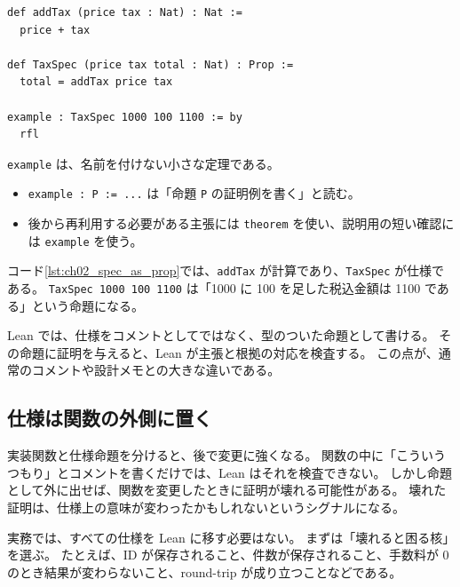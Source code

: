 \begin{listing}[htbp]
\begin{verbatim}
def addTax (price tax : Nat) : Nat :=
  price + tax

def TaxSpec (price tax total : Nat) : Prop :=
  total = addTax price tax

example : TaxSpec 1000 100 1100 := by
  rfl
\end{verbatim}
\caption{仕様を関数と命題に分ける}
\label{lst:ch02_spec_as_prop}
\end{listing}

\begin{syntaxbox}
\texttt{example} は、名前を付けない小さな定理である。
\begin{itemize}
\item \texttt{example : P := ...} は「命題 \texttt{P} の証明例を書く」と読む。
\item 後から再利用する必要がある主張には \texttt{theorem} を使い、説明用の短い確認には \texttt{example} を使う。
\end{itemize}
\end{syntaxbox}


コード\ref{lst:ch02_spec_as_prop}では、\texttt{addTax} が計算であり、\texttt{TaxSpec} が仕様である。
\texttt{TaxSpec 1000 100 1100} は「1000 に 100 を足した税込金額は 1100 である」という命題になる。

\begin{leanbox}
Lean では、仕様をコメントとしてではなく、型のついた命題として書ける。
その命題に証明を与えると、Lean が主張と根拠の対応を検査する。
この点が、通常のコメントや設計メモとの大きな違いである。
\end{leanbox}

\subsection{仕様は関数の外側に置く}

実装関数と仕様命題を分けると、後で変更に強くなる。
関数の中に「こういうつもり」とコメントを書くだけでは、Lean はそれを検査できない。
しかし命題として外に出せば、関数を変更したときに証明が壊れる可能性がある。
壊れた証明は、仕様上の意味が変わったかもしれないというシグナルになる。

\begin{softwarebox}
実務では、すべての仕様を Lean に移す必要はない。
まずは「壊れると困る核」を選ぶ。
たとえば、ID が保存されること、件数が保存されること、手数料が 0 のとき結果が変わらないこと、round-trip が成り立つことなどである。
\end{softwarebox}

